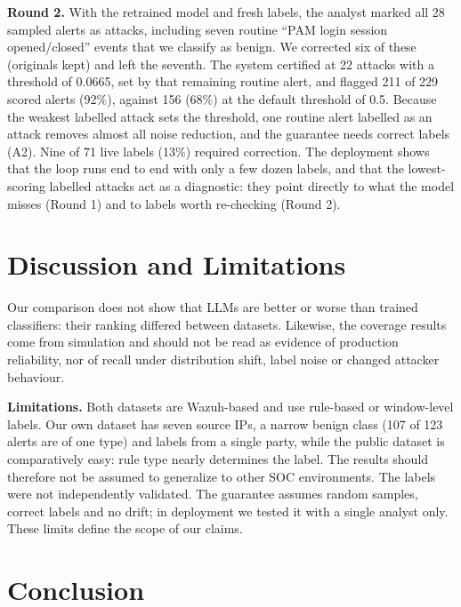 \documentclass[conference]{IEEEtran}
\begin{document}
\textbf{Round 2.} With the retrained model and fresh labels, the analyst marked all 28 sampled
alerts as attacks, including seven routine ``PAM login session opened/closed'' events that we
classify as benign. We corrected six of these (originals kept) and left
the seventh. The system certified at 22 attacks with a threshold of 0.0665, set by that remaining
routine alert, and flagged 211 of 229 scored alerts (92\%), against 156 (68\%) at the default
threshold of 0.5. Because the weakest labelled attack sets the threshold, one routine alert labelled as an attack
removes almost all noise reduction, and the guarantee needs correct labels (A2). Nine of 71 live labels (13\%) required correction.
The deployment shows that the loop runs end to end with only a few dozen labels, and that the
lowest-scoring labelled attacks act as a diagnostic: they point directly to what the model
misses (Round 1) and to labels worth re-checking (Round 2).

\section{Discussion and Limitations}

Our comparison does not show that LLMs are better or worse than trained classifiers: their ranking differed between datasets. Likewise, the coverage results come from
simulation and should not be read as evidence of production reliability, nor of recall under
distribution shift, label noise or changed attacker behaviour.

\textbf{Limitations.} Both datasets are Wazuh-based and use rule-based or window-level labels.
Our own dataset has seven source IPs, a narrow benign class (107 of 123 alerts are of one type) and
labels from a single party, while the public dataset is comparatively easy: rule type nearly
determines the label. The results should therefore not be assumed to generalize to
other SOC environments. The labels were not independently validated. The guarantee
assumes random samples, correct labels and no drift; in deployment we tested it with a single
analyst only. These limits define the scope of our claims.

\section{Conclusion}
\end{document}
